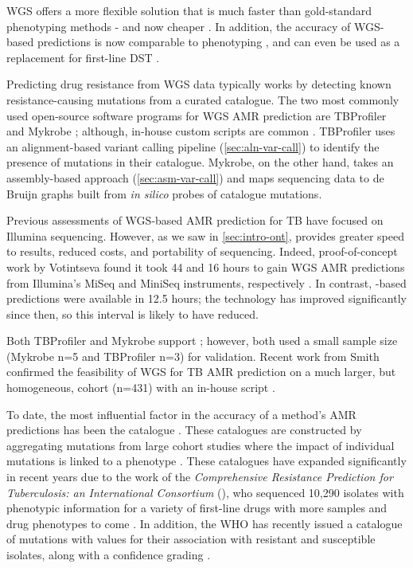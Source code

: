 \noindent
WGS offers a more flexible solution that is much faster than gold-standard phenotyping methods - and now cheaper \cite{Pankhurst2016,Votintseva2015,Votintseva2017}. In addition, the accuracy of WGS-based predictions is now comparable to phenotyping \cite{hunt2019,walker2015,bradley2015,Pankhurst2016,Votintseva2015}, and can even be used as a replacement for first-line DST \cite{cryptic2018}. 

Predicting drug resistance from WGS data typically works by detecting known resistance-causing mutations from a curated catalogue. The two most commonly used open-source software programs for WGS AMR prediction are TBProfiler \cite{coll2015,phelan2019} and Mykrobe \cite{bradley2015,hunt2019}; although, in-house custom scripts are common \cite{smith2020,cryptic2018}. TBProfiler uses an alignment-based variant calling pipeline (\autoref{sec:aln-var-call}) to identify the presence of mutations in their catalogue. Mykrobe, on the other hand, takes an assembly-based approach (\autoref{sec:asm-var-call}) and maps sequencing data to de Bruijn graphs built from \textit{in silico} probes of catalogue mutations. 

Previous assessments of WGS-based AMR prediction for TB have focused on Illumina sequencing. However, as we saw in \autoref{sec:intro-ont}, \ont{} provides greater speed to results, reduced costs, and portability of sequencing. Indeed, proof-of-concept work by Votintseva \etal{} found it took 44 and 16 hours to gain WGS AMR predictions from Illumina's MiSeq and MiniSeq instruments, respectively \cite{Votintseva2017}. In contrast, \ont{}-based predictions were available in 12.5 hours; the technology has improved significantly since then, so this interval is likely to have reduced.

Both TBProfiler and Mykrobe support \ont{}; however, both used a small sample size (Mykrobe n=5 and TBProfiler n=3) for validation. Recent work from Smith \etal{} confirmed the feasibility of \ont{} WGS for TB AMR prediction on a much larger, but homogeneous, cohort (n=431) with an in-house script \cite{smith2020}.

To date, the most influential factor in the accuracy of a method's AMR predictions has been the catalogue \cite{hunt2019}. These catalogues are constructed by aggregating mutations from large cohort studies where the impact of individual mutations is linked to a phenotype \cite{hunt2019,miotto2017,phelan2019}. These catalogues have expanded significantly in recent years due to the work of the \emph{Comprehensive Resistance Prediction for Tuberculosis: an International Consortium} (\cryptic{}), who sequenced 10,290 isolates with phenotypic information for a variety of first-line drugs \cite{cryptic2018} with more samples and drug phenotypes to come \cite{Votintseva2015}. In addition, the WHO has recently issued a catalogue of mutations with values for their association with resistant and susceptible isolates, along with a confidence grading \cite{whopanel2021}.

